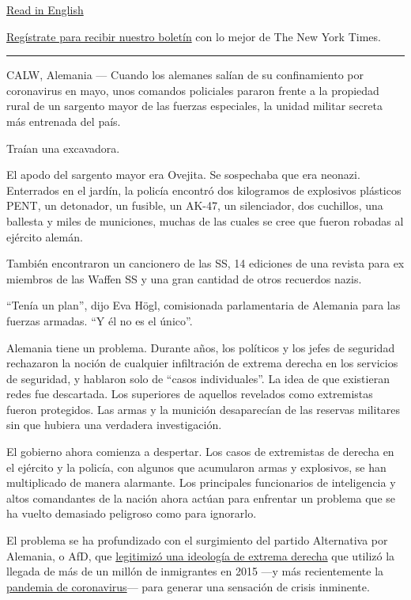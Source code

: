 \href{https://www.nytimes.com/2020/07/03/world/europe/germany-military-neo-nazis-ksk.html}{Read
in English}

\href{https://www.nytimes.com/newsletters/el-times}{Regístrate para
recibir nuestro boletín} con lo mejor de The New York Times.

\begin{center}\rule{0.5\linewidth}{\linethickness}\end{center}

CALW, Alemania --- Cuando los alemanes salían de su confinamiento por
coronavirus en mayo, unos comandos policiales pararon frente a la
propiedad rural de un sargento mayor de las fuerzas especiales, la
unidad militar secreta más entrenada del país.

Traían una excavadora.

El apodo del sargento mayor era Ovejita. Se sospechaba que era neonazi.
Enterrados en el jardín, la policía encontró dos kilogramos de
explosivos plásticos PENT, un detonador, un fusible, un AK-47, un
silenciador, dos cuchillos, una ballesta y miles de municiones, muchas
de las cuales se cree que fueron robadas al ejército alemán.

También encontraron un cancionero de las SS, 14 ediciones de una revista
para ex miembros de las Waffen SS y una gran cantidad de otros recuerdos
nazis.

``Tenía un plan'', dijo Eva Högl, comisionada parlamentaria de Alemania
para las fuerzas armadas. ``Y él no es el único''.

Alemania tiene un problema. Durante años, los políticos y los jefes de
seguridad rechazaron la noción de cualquier infiltración de extrema
derecha en los servicios de seguridad, y hablaron solo de ``casos
individuales''. La idea de que existieran redes fue descartada. Los
superiores de aquellos revelados como extremistas fueron protegidos. Las
armas y la munición desaparecían de las reservas militares sin que
hubiera una verdadera investigación.

El gobierno ahora comienza a despertar. Los casos de extremistas de
derecha en el ejército y la policía, con algunos que acumularon armas y
explosivos, se han multiplicado de manera alarmante. Los principales
funcionarios de inteligencia y altos comandantes de la nación ahora
actúan para enfrentar un problema que se ha vuelto demasiado peligroso
como para ignorarlo.

El problema se ha profundizado con el surgimiento del partido
Alternativa por Alemania, o AfD, que
\href{https://www.nytimes.com/2019/10/26/world/europe/afd-election-east-germany-hoecke.html}{legitimizó
una ideología de extrema derecha} que utilizó la llegada de más de un
millón de inmigrantes en 2015 ---y más recientemente la
\href{https://www.nytimes.com/2020/05/18/world/europe/coronavirus-germany-far-right.html}{pandemia
de coronavirus}--- para generar una sensación de crisis inminente.

